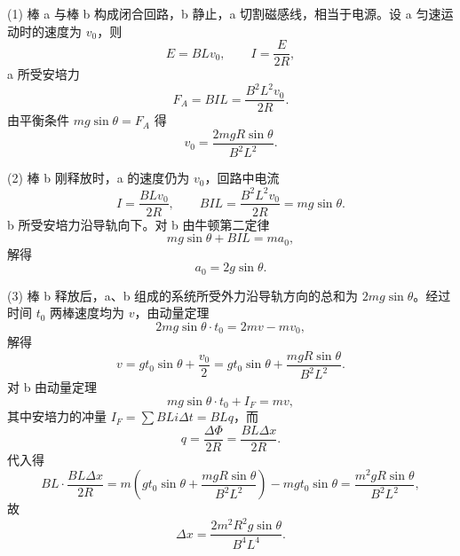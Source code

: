 \begin{answer}
(1) 棒 a 与棒 b 构成闭合回路，b 静止，a 切割磁感线，相当于电源。设 a 匀速运动时的速度为 $v_{0}$，则
\[
  E=BLv_{0},\qquad I=\frac{E}{2R},
\]
a 所受安培力
\[
  F_{A}=BIL=\frac{B^{2}L^{2}v_{0}}{2R}.
\]
由平衡条件 $mg\sin\theta=F_{A}$ 得
\[
  v_{0}=\frac{2mgR\sin\theta}{B^{2}L^{2}}.
\]

(2) 棒 b 刚释放时，a 的速度仍为 $v_{0}$，回路中电流
\[
  I=\frac{BLv_{0}}{2R},\qquad BIL=\frac{B^{2}L^{2}v_{0}}{2R}=mg\sin\theta.
\]
b 所受安培力沿导轨向下。对 b 由牛顿第二定律
\[
  mg\sin\theta+BIL=ma_{0},
\]
解得
\[
  a_{0}=2g\sin\theta.
\]

(3) 棒 b 释放后，a、b 组成的系统所受外力沿导轨方向的总和为 $2mg\sin\theta$。经过时间 $t_{0}$ 两棒速度均为 $v$，由动量定理
\[
  2mg\sin\theta\cdot t_{0}=2mv-mv_{0},
\]
解得
\[
  v=gt_{0}\sin\theta+\frac{v_{0}}{2}
   =gt_{0}\sin\theta+\frac{mgR\sin\theta}{B^{2}L^{2}}.
\]
对 b 由动量定理
\[
  mg\sin\theta\cdot t_{0}+I_{F}=mv,
\]
其中安培力的冲量 $I_{F}=\sum BLi\Delta t=BLq$，而
\[
  q=\frac{\Delta\Phi}{2R}=\frac{BL\Delta x}{2R}.
\]
代入得
\[
  BL\cdot\frac{BL\Delta x}{2R}
  =m\left(gt_{0}\sin\theta+\frac{mgR\sin\theta}{B^{2}L^{2}}\right)-mg t_{0}\sin\theta
  =\frac{m^{2}gR\sin\theta}{B^{2}L^{2}},
\]
故
\[
  \Delta x=\frac{2m^{2}R^{2}g\sin\theta}{B^{4}L^{4}}.
\]
\end{answer}

